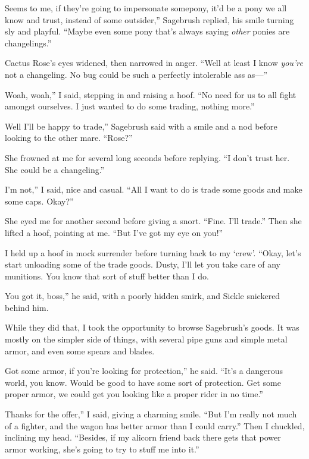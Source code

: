 \leavevmode{}Seems to me, if they’re going to impersonate somepony, it’d be a pony we all know and trust, instead of some outsider,” Sagebrush replied, his smile turning sly and playful. “Maybe even some pony that’s always saying \textit{other} ponies are changelings.”

Cactus Rose’s eyes widened, then narrowed in anger. “Well at least I know \textit{you’re} not a changeling. No bug could be such a perfectly intolerable ass as—”

\leavevmode{}Woah, woah,” I said, stepping in and raising a hoof. “No need for us to all fight amongst ourselves. I just wanted to do some trading, nothing more.”

\leavevmode{}Well I’ll be happy to trade,” Sagebrush said with a smile and a nod before looking to the other mare. “Rose?”

She frowned at me for several long seconds before replying. “I don’t trust her. She could be a changeling.”

\leavevmode{}I’m not,” I said, nice and casual. “All I want to do is trade some goods and make some caps. Okay?”

She eyed me for another second before giving a snort. “Fine. I’ll trade.” Then she lifted a hoof, pointing at me. “But I’ve got my eye on you!”

I held up a hoof in mock surrender before turning back to my ‘crew’. “Okay, let’s start unloading some of the trade goods. Dusty, I’ll let you take care of any munitions. You know that sort of stuff better than I do.

\leavevmode{}You got it, boss,” he said, with a poorly hidden smirk, and Sickle snickered behind him.

While they did that, I took the opportunity to browse Sagebrush’s goods. It was mostly on the simpler side of things, with several pipe guns and simple metal armor, and even some spears and blades.

\leavevmode{}Got some armor, if you’re looking for protection,” he said. “It’s a dangerous world, you know. Would be good to have some sort of protection. Get some proper armor, we could get you looking like a proper rider in no time.”

\leavevmode{}Thanks for the offer,” I said, giving a charming smile. “But I’m really not much of a fighter, and the wagon has better armor than I could carry.” Then I chuckled, inclining my head. “Besides, if my alicorn friend back there gets that power armor working, she’s going to try to stuff me into it.”

